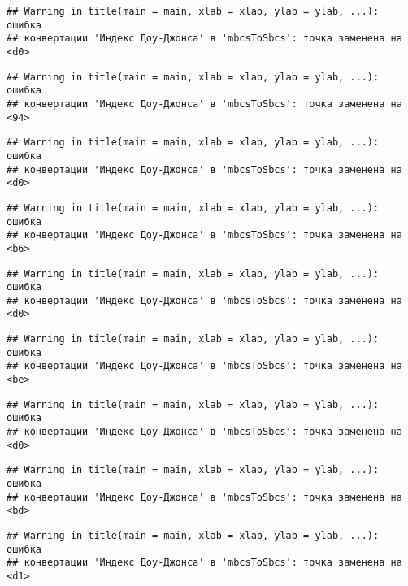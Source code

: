 \documentclass[
]{article}
\begin{document}
\begin{verbatim}
## Warning in title(main = main, xlab = xlab, ylab = ylab, ...): ошибка
## конвертации 'Индекс Доу-Джонса' в 'mbcsToSbcs': точка заменена на <d0>
\end{verbatim}

\begin{verbatim}
## Warning in title(main = main, xlab = xlab, ylab = ylab, ...): ошибка
## конвертации 'Индекс Доу-Джонса' в 'mbcsToSbcs': точка заменена на <94>
\end{verbatim}

\begin{verbatim}
## Warning in title(main = main, xlab = xlab, ylab = ylab, ...): ошибка
## конвертации 'Индекс Доу-Джонса' в 'mbcsToSbcs': точка заменена на <d0>
\end{verbatim}

\begin{verbatim}
## Warning in title(main = main, xlab = xlab, ylab = ylab, ...): ошибка
## конвертации 'Индекс Доу-Джонса' в 'mbcsToSbcs': точка заменена на <b6>
\end{verbatim}

\begin{verbatim}
## Warning in title(main = main, xlab = xlab, ylab = ylab, ...): ошибка
## конвертации 'Индекс Доу-Джонса' в 'mbcsToSbcs': точка заменена на <d0>
\end{verbatim}

\begin{verbatim}
## Warning in title(main = main, xlab = xlab, ylab = ylab, ...): ошибка
## конвертации 'Индекс Доу-Джонса' в 'mbcsToSbcs': точка заменена на <be>
\end{verbatim}

\begin{verbatim}
## Warning in title(main = main, xlab = xlab, ylab = ylab, ...): ошибка
## конвертации 'Индекс Доу-Джонса' в 'mbcsToSbcs': точка заменена на <d0>
\end{verbatim}

\begin{verbatim}
## Warning in title(main = main, xlab = xlab, ylab = ylab, ...): ошибка
## конвертации 'Индекс Доу-Джонса' в 'mbcsToSbcs': точка заменена на <bd>
\end{verbatim}

\begin{verbatim}
## Warning in title(main = main, xlab = xlab, ylab = ylab, ...): ошибка
## конвертации 'Индекс Доу-Джонса' в 'mbcsToSbcs': точка заменена на <d1>
\end{verbatim}
\end{document}
